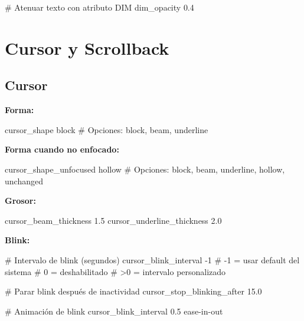 \documentclass[
  doc,
  floatsintext,
  longtable,
  a4paper,
  nolmodern,
  notxfonts,
  notimes,
  12pt,
  colorlinks=true,linkcolor=blue,citecolor=blue,urlcolor=blue]{apa7}
\newenvironment{Shaded}{\begin{snugshade}}{\end{snugshade}}
\newcommand{\CommentTok}[1]{\textcolor[rgb]{0.37,0.37,0.37}{#1}}
\newcommand{\DataTypeTok}[1]{\textcolor[rgb]{0.68,0.00,0.00}{#1}}
\begin{document}
\begin{Shaded}
\begin{Highlighting}[]
\CommentTok{\# Atenuar texto con atributo DIM}
\DataTypeTok{dim\_opacity} \DataTypeTok{0.4}
\end{Highlighting}
\end{Shaded}

\section{Cursor y Scrollback}\label{cursor-y-scrollback}

\subsection{Cursor}\label{cursor}

\textbf{Forma:}

\begin{Shaded}
\begin{Highlighting}[]
\DataTypeTok{cursor\_shape} \DataTypeTok{block}
\CommentTok{\# Opciones: block, beam, underline}
\end{Highlighting}
\end{Shaded}

\textbf{Forma cuando no enfocado:}

\begin{Shaded}
\begin{Highlighting}[]
\DataTypeTok{cursor\_shape\_unfocused} \DataTypeTok{hollow}
\CommentTok{\# Opciones: block, beam, underline, hollow, unchanged}
\end{Highlighting}
\end{Shaded}

\textbf{Grosor:}

\begin{Shaded}
\begin{Highlighting}[]
\DataTypeTok{cursor\_beam\_thickness} \DataTypeTok{1.5}
\DataTypeTok{cursor\_underline\_thickness} \DataTypeTok{2.0}
\end{Highlighting}
\end{Shaded}

\textbf{Blink:}

\begin{Shaded}
\begin{Highlighting}[]
\CommentTok{\# Intervalo de blink (segundos)}
\DataTypeTok{cursor\_blink\_interval} \DataTypeTok{{-}1}
\CommentTok{\# {-}1 = usar default del sistema}
\CommentTok{\# 0 = deshabilitado}
\CommentTok{\# \textgreater{}0 = intervalo personalizado}

\CommentTok{\# Parar blink después de inactividad}
\DataTypeTok{cursor\_stop\_blinking\_after} \DataTypeTok{15.0}

\CommentTok{\# Animación de blink}
\DataTypeTok{cursor\_blink\_interval} \DataTypeTok{0.5} \DataTypeTok{ease{-}in{-}out}
\end{Highlighting}
\end{Shaded}
\end{document}
